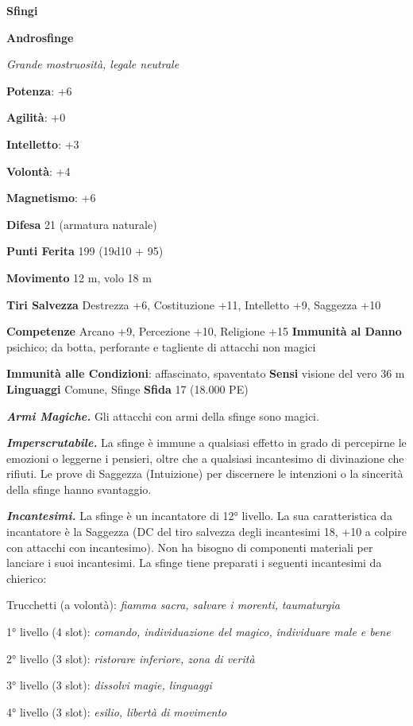 \begin{multicols}{2}
\textbf{Sfingi}

\textbf{Androsfinge}

\emph{Grande mostruosità, legale neutrale}

\textbf{Potenza}: +6

\textbf{Agilità}: +0

\textbf{Intelletto}: +3

\textbf{Volontà}: +4

\textbf{Magnetismo}: +6

\textbf{Difesa} 21 (armatura naturale)

\textbf{Punti Ferita} 199 (19d10 + 95)

\textbf{Movimento} 12 m, volo 18 m

\textbf{Tiri Salvezza} Destrezza +6, Costituzione +11, Intelletto +9,
Saggezza +10

\textbf{Competenze} Arcano +9, Percezione +10, Religione +15
\textbf{Immunità al Danno} psichico; da botta, perforante e tagliente
di attacchi non magici

\textbf{Immunità alle Condizioni}: affascinato, spaventato \textbf{Sensi}
visione del vero 36 m \textbf{Linguaggi} Comune,
Sfinge \textbf{Sfida} 17 (18.000 PE)\smallskip

\emph{\textbf{Armi Magiche.}} Gli attacchi con armi della sfinge sono
magici.

\emph{\textbf{Imperscrutabile.}} La sfinge è immune a qualsiasi effetto
in grado di percepirne le emozioni o leggerne i pensieri, oltre che a
qualsiasi incantesimo di divinazione che rifiuti. Le prove di Saggezza
(Intuizione) per discernere le intenzioni o la sincerità della sfinge
hanno svantaggio.

\emph{\textbf{Incantesimi.}} La sfinge è un incantatore di 12° livello.
La sua caratteristica da incantatore è la Saggezza (DC del tiro salvezza
degli incantesimi 18, +10 a colpire con attacchi con incantesimo). Non
ha bisogno di componenti materiali per lanciare i suoi incantesimi. La
sfinge tiene preparati i seguenti incantesimi da chierico:

Trucchetti (a volontà): \emph{fiamma sacra, salvare i morenti,}
\emph{taumaturgia}

1° livello (4 slot): \emph{comando, individuazione del magico,}
\emph{individuare male e bene}

2° livello (3 slot): \emph{ristorare inferiore, zona di verità}

3° livello (3 slot): \emph{dissolvi magie, linguaggi}

4° livello (3 slot): \emph{esilio, libertà di movimento}


\end{multicols}
